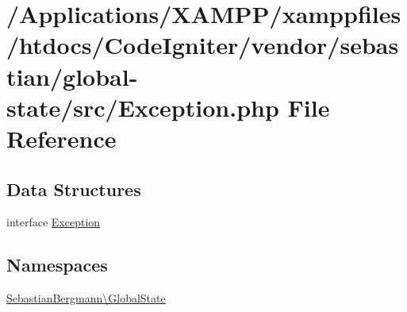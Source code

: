 \hypertarget{sebastian_2global-state_2src_2_exception_8php}{}\section{/\+Applications/\+X\+A\+M\+P\+P/xamppfiles/htdocs/\+Code\+Igniter/vendor/sebastian/global-\/state/src/\+Exception.php File Reference}
\label{sebastian_2global-state_2src_2_exception_8php}
\subsection*{Data Structures}
\begin{DoxyCompactItemize}
\item 
interface \mbox{\hyperlink{interface_sebastian_bergmann_1_1_global_state_1_1_exception}{Exception}}
\end{DoxyCompactItemize}
\subsection*{Namespaces}
\begin{DoxyCompactItemize}
\item 
 \mbox{\hyperlink{namespace_sebastian_bergmann_1_1_global_state}{Sebastian\+Bergmann\textbackslash{}\+Global\+State}}
\end{DoxyCompactItemize}

